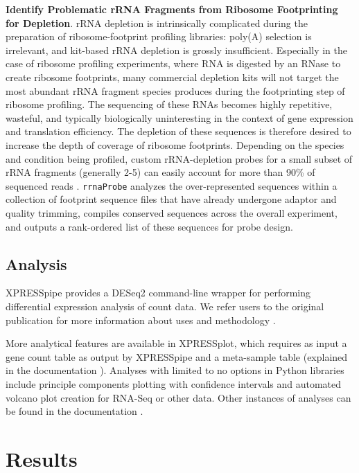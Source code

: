 \documentclass[10pt, oneside]{article}
\begin{document}
\noindent\textbf{Identify Problematic rRNA Fragments from Ribosome Footprinting for Depletion}. rRNA depletion is intrinsically complicated during the preparation of ribosome-footprint profiling libraries: poly(A) selection is irrelevant, and kit-based rRNA depletion is grossly insufficient. Especially in the case of ribosome profiling experiments, where RNA is digested by an RNase to create ribosome footprints, many commercial depletion kits will not target the most abundant rRNA fragment species produces during the footprinting step of ribosome profiling. The sequencing of these RNAs becomes highly repetitive, wasteful, and typically biologically uninteresting in the context of gene expression and translation efficiency. The depletion of these sequences is therefore desired to increase the depth of coverage of ribosome footprints. Depending on the species and condition being profiled, custom rRNA-depletion probes for a small subset of rRNA fragments (generally 2-5) can easily account for more than 90\% of sequenced reads \cite{ingolia_meth, ingolia_science}. \texttt{rrnaProbe} analyzes the over-represented sequences within a collection of footprint sequence files that have already undergone adaptor and quality trimming, compiles conserved sequences across the overall experiment, and outputs a rank-ordered list of these sequences for probe design.\\

\subsection*{Analysis}
XPRESSpipe provides a DESeq2 command-line wrapper for performing differential expression analysis of count data. We refer users to the original publication for more information about uses and methodology \cite{deseq2}.\par

More analytical features are available in XPRESSplot, which requires as input a gene count table as output by XPRESSpipe and a meta-sample table (explained in the documentation \cite{xpressplot_docs}). Analyses with limited to no options in Python libraries include principle components plotting with confidence intervals and automated volcano plot creation for RNA-Seq or other data. Other instances of analyses can be found in the documentation \cite{xpressplot_docs}.\\

\section*{Results}
\end{document}
